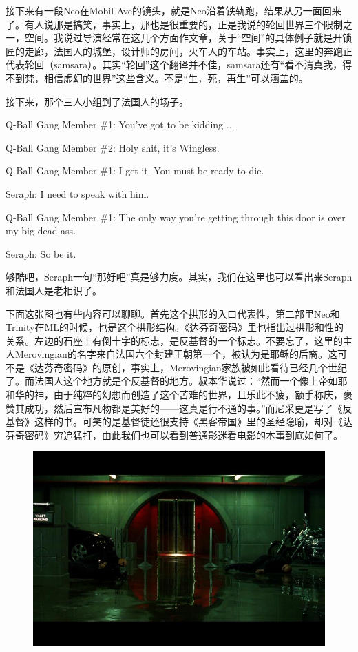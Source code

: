 \documentclass[UTF8]{ctexart}
\newenvironment{myquote}{\color{green} \setlength{\leftskip}{6em} \setlength{\rightskip}{4em} \setlength{\parindent}{-2em}}{\par}
\begin{document}
接下来有一段Neo在Mobil Ave的镜头，就是Neo沿着铁轨跑，结果从另一面回来了。有人说那是搞笑，事实上，那也是很重要的，正是我说的轮回世界三个限制之一，空间。我说过导演经常在这几个方面作文章，关于“空间”的具体例子就是开锁匠的走廊，法国人的城堡，设计师的房间，火车人的车站。事实上，这里的奔跑正代表轮回（samsara）。其实“轮回”这个翻译并不佳，samsara还有“看不清真我，得不到梵，相信虚幻的世界”这些含义。不是“生，死，再生”可以涵盖的。

接下来，那个三人小组到了法国人的场子。

\begin{myquote}
Q-Ball Gang Member \#1: You've got to be kidding ...

Q-Ball Gang Member \#2: Holy shit, it's Wingless.

Q-Ball Gang Member \#1: I get it. You must be ready to die.

Seraph: I need to speak with him.

Q-Ball Gang Member \#1: The only way you're getting through this door is over my big dead ass.

Seraph: So be it.
\end{myquote}

够酷吧，Seraph一句“那好吧”真是够力度。其实，我们在这里也可以看出来Seraph和法国人是老相识了。

下面这张图也有些内容可以聊聊。首先这个拱形的入口代表性，第二部里Neo和Trinity在ML的时候，也是这个拱形结构。《达芬奇密码》里也指出过拱形和性的关系。左边的石座上有倒十字的标志，是反基督的一个标志。不要忘了，这里的主人Merovingian的名字来自法国六个封建王朝第一个，被认为是耶稣的后裔。这可不是《达芬奇密码》的原创，事实上，Merovingian家族被如此看待已经几个世纪了。而法国人这个地方就是个反基督的地方。叔本华说过：“然而一个像上帝如耶和华的神，由于纯粹的幻想而创造了这个苦难的世界，且乐此不疲，额手称庆，褒赞其成功，然后宣布凡物都是美好的——这真是行不通的事。”而尼采更是写了《反基督》这样的书。可笑的是基督徒还很支持《黑客帝国》里的圣经隐喻，却对《达芬奇密码》穷追猛打，由此我们也可以看到普通影迷看电影的本事到底如何了。

\begin{figure}[htb]
\centering
\includegraphics[width=0.5\linewidth]{fig/4fd64bed745da1d4b31cb1f5.jpg}
\end{figure}
\end{document}
